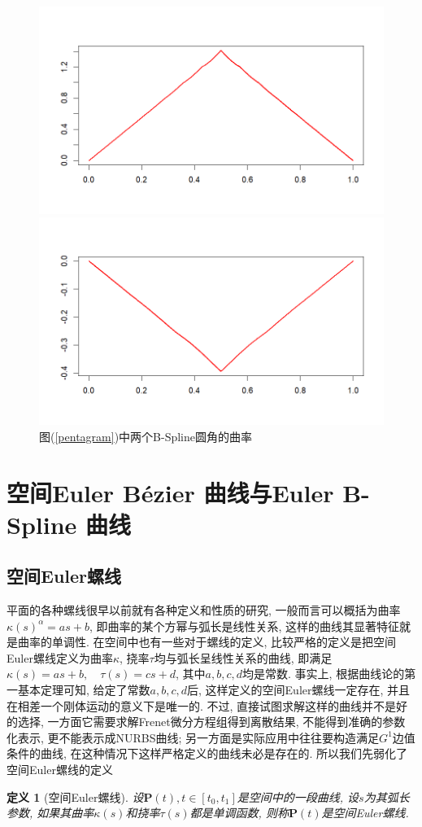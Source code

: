 \documentclass[utf8]{ctexart} %
\newtheorem{definition}{\indent 定义}[section]
\begin{document}
\begin{figure}
	\centering
	\begin{minipage}{0.49\linewidth}
		\centering
		\includegraphics[width=0.7\linewidth]{figures/Pentagram_B-Spline1.png}
	\end{minipage}
	\begin{minipage}{0.49\linewidth}
		\centering
		\includegraphics[width=0.7\linewidth]{figures/Pentagram_B-Spline2.png}
	\end{minipage}
\caption{\small{图(\ref{pentagram})中两个B-Spline圆角的曲率}}
\end{figure}
	 \section{空间Euler B\'{e}zier 曲线与Euler B-Spline 曲线}
	 \subsection{空间Euler螺线}
	 平面的各种螺线很早以前就有各种定义和性质的研究, 一般而言可以概括为曲率$\kappa(s)^{\alpha} = as+b$, 即曲率的某个方幂与弧长是线性关系, 这样的曲线其显著特征就是曲率的单调性. 在空间中也有一些对于螺线的定义, 比较严格的定义是把空间Euler螺线定义为曲率$\kappa$, 挠率$\tau$均与弧长呈线性关系的曲线, 即满足$\kappa(s) = as+b,\quad\tau(s) = cs+d$, 其中$a,b,c,d$均是常数. 事实上, 根据曲线论的第一基本定理可知, 给定了常数$a,b,c,d$后, 这样定义的空间Euler螺线一定存在, 并且在相差一个刚体运动的意义下是唯一的. 不过, 直接试图求解这样的曲线并不是好的选择, 一方面它需要求解Frenet微分方程组得到离散结果, 不能得到准确的参数化表示, 更不能表示成NURBS曲线; 另一方面是实际应用中往往要构造满足$G^1$边值条件的曲线, 在这种情况下这样严格定义的曲线未必是存在的. 所以我们先弱化了空间Euler螺线的定义
	 \begin{definition}[空间Euler螺线]
	 	设$\boldsymbol{P}(t), t\in[t_0,t_1]$是空间中的一段曲线, 设$s$为其弧长参数, 如果其曲率$\kappa(s)$和挠率$\tau(s)$都是单调函数, 则称$\boldsymbol{P}(t)$是空间Euler螺线.
	 \end{definition}
\end{document}
